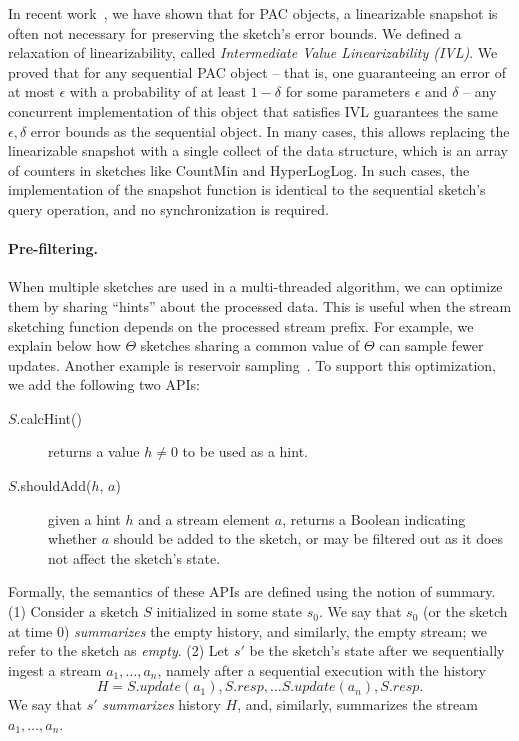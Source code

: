 In recent work~\cite{rinberg_et_al:LIPIcs:2020:13080}, we have shown that for PAC objects, a linearizable snapshot is often not necessary for preserving the sketch's error bounds. We defined a relaxation of linearizability, called \emph{Intermediate Value Linearizability (IVL)}. We proved that for any sequential PAC object  -- that is, one guaranteeing an error of at most $\epsilon$ with a probability of at least $1-\delta$ for some parameters $\epsilon$ and $\delta$ -- any concurrent implementation of this object that satisfies IVL guarantees the same $\epsilon, \delta$ error bounds as the sequential object. In many cases, this allows replacing the linearizable snapshot with a single collect of the data structure, which is an array of counters in sketches like CountMin and HyperLogLog. In such cases, the implementation of the snapshot function is identical to the sequential sketch's query operation, and no synchronization is required. 

\paragraph{Pre-filtering.} When multiple sketches are used in a multi-threaded algorithm,
we can optimize them by sharing ``hints'' about the processed data.
This is useful when the stream sketching function depends on the processed stream prefix.
For example, we explain below how $\Theta$ sketches sharing a common value of $\Theta$ can sample fewer updates.
Another example is reservoir sampling~\cite{vitter1985random}. To support this optimization,
we add the following two APIs:
\begin{description}
    \item[$S$.calcHint()] returns a value $h \neq 0$ to be used as a hint.
    \item[$S$.shouldAdd($h$, $a$)] given a hint $h$ and a stream element $a$, returns a Boolean indicating whether $a$
		should be added to the sketch, or may be filtered out as it does not affect the sketch's state.
\end{description}    
    Formally, the semantics of these APIs are defined using the notion of summary.
		(1) Consider a sketch $S$ initialized in some state $s_0$. We say that $s_0$ (or the sketch at time $0$) \emph{summarizes} the empty history,
    and similarly, the empty stream; we refer to the sketch as \emph{empty}.
		(2) Let $s'$ be the sketch's state after we sequentially ingest a stream $a_1, \dots ,a_n$, namely after 		
		a sequential execution with the history 
		\[H= S.update(a_1), S.resp, \dots S.update(a_n), S.resp.\] 
		We say that $s'$ \emph{summarizes} history $H$, and,
    similarly, summarizes the stream $a_1, \dots ,a_n$.
    
